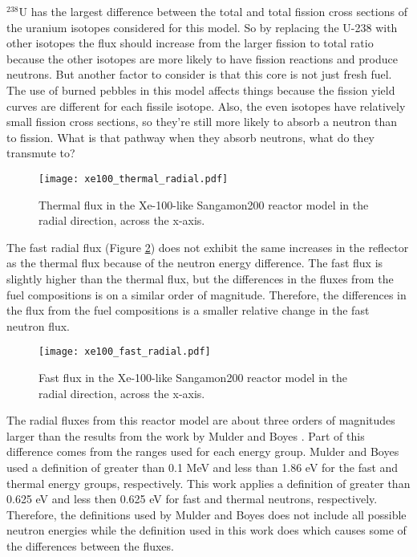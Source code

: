 $^{238}$U has the largest difference between the total and total 
fission cross sections of the uranium isotopes considered for this model. 
So by replacing the U-238 with other isotopes the flux should 
increase from the larger fission to total ratio because the other isotopes 
are more likely to have fission reactions and produce neutrons. But 
another factor to consider is that this core is not just fresh fuel. 
The use of burned pebbles in this model affects things because the 
fission yield curves are different for each fissile isotope. 
Also, the even isotopes have relatively small fission cross sections, 
so they're still more likely to absorb a neutron than to fission. 
What is that pathway when they absorb neutrons, what do they transmute to?


\begin{figure}
        \centering 
        \texttt{[image: xe100\_thermal\_radial.pdf]}
        \caption{Thermal flux in the Xe-100-like Sangamon200 
        reactor model in the radial direction, across the 
        x-axis.}
        \label{fig:xe100_thermal_radial}
\end{figure}

The fast radial flux (Figure \ref{fig:xe100_fast_radial}) does not 
exhibit the same increases in the reflector as the thermal flux 
because of the neutron energy difference. The fast flux is slightly 
higher than the thermal flux, but the differences in the fluxes from 
the fuel compositions is on a similar order of magnitude. Therefore, 
the differences in the flux from the fuel compositions is a smaller 
relative change in the fast neutron flux. 

\begin{figure}
        \centering 
        \texttt{[image: xe100\_fast\_radial.pdf]}
        \caption{Fast flux in the Xe-100-like Sangamon200 
        reactor model in the radial direction, across the 
        x-axis.}
        \label{fig:xe100_fast_radial}
\end{figure}

The radial fluxes from this reactor model are about three orders of 
magnitudes larger than the results from the work by Mulder and 
Boyes \cite{mulder_neutronics_2020}. Part of this difference comes 
from the ranges used for each energy group. Mulder and Boyes used 
a definition of greater than 0.1 MeV and less than 1.86 eV for the 
fast and thermal energy groups, respectively. This work applies a 
definition of greater than 0.625 eV and less then 0.625 eV for fast 
and thermal neutrons, respectively. Therefore, the definitions used by 
Mulder and Boyes does not include all possible neutron energies 
while the definition used in this work does which causes some of the 
differences between the fluxes. 

